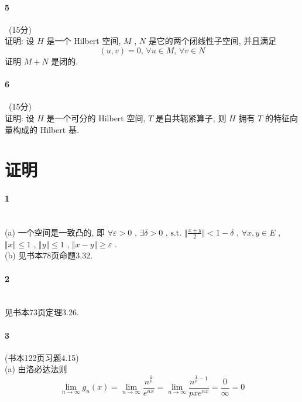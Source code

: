 \documentclass[a4paper, UTF8]{ctexart}				%
\numberwithin{equation}{section}				%
\begin{document}
		\paragraph{5} \, (15分)\\
			\indent 证明: 设 $H$ 是一个 Hilbert 空间, $M$ , $N$ 是它的两个闭线性子空间, 并且满足 
			\[
				({u},{v}) = 0, \, \forall u \in M, \, \forall v \in N
			\]
			\indent 证明 $M + N$ 是闭的.\\

		\paragraph{6} \, (15分)\\
			\indent 证明: 设 $H$ 是一个可分的 Hilbert 空间, $T$ 是自共轭紧算子, 则 $H$ 拥有 $T$ 的特征向量构成的 Hilbert 基.\\

	\section{证明}\label{proof}
		\paragraph{1}\quad\\
			\indent (a) 一个空间是一致凸的, 即 $\forall \varepsilon > 0$ , $\exists \delta > 0$ , $\text{s.t. } \Vert{\frac{x + y}{2}}\Vert < 1 - \delta$ , $\forall x, y \in E$ , $\Vert{x}\Vert \le 1$ , $\Vert{y}\Vert \le 1$ , $\Vert{x - y}\Vert \ge \varepsilon$ .\\
			\indent (b) 见书本78页命题3.32.\\

		\paragraph{2}\quad\\
			\indent 见书本73页定理3.26.\\

		\paragraph{3}\quad (书本122页习题4.15)\\
			\indent (a) 由洛必达法则
			\[
				\lim_{n \rightarrow \infty} g_n(x) = \lim_{n \rightarrow \infty} \frac{n^{\frac{1}{p}}}{e^{nx}} = \lim_{n \rightarrow \infty} \frac{n^{\frac{1}{p} - 1}}{p x e^{nx}} = \frac{0}{\infty} = 0
			\]
			
\end{document}
